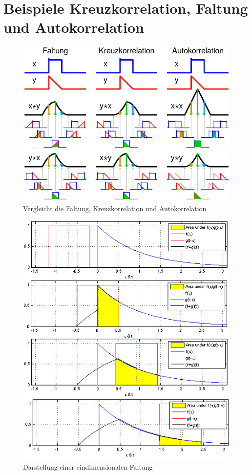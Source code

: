 \section{Beispiele Kreuzkorrelation, Faltung und Autokorrelation}
\begin{figure}[H]
  \centering
  \includegraphics[width=0.8\linewidth]{./images/comparisonConvolutionCorrelation.png}
  \caption[Vergleich zwischen Faltung, Kreuzkorrelation und Autokorrelation]{Vergleicht die Faltung, Kreuzkorrelation und Autokorrelation\footnotemark}
  \label{fig:compareConvulationCrosscorrelationAutoCorrelation}
\end{figure}

\begin{figure}[H]
  \centering
  \includegraphics[width=0.8\linewidth]{./images/convolution1.png}
  \caption[Beispiel 1 für die Faltung]{Darstellung einer eindimensionalen Faltung\footnotemark}
  \label{fig:convolutionExample1}
\end{figure}

